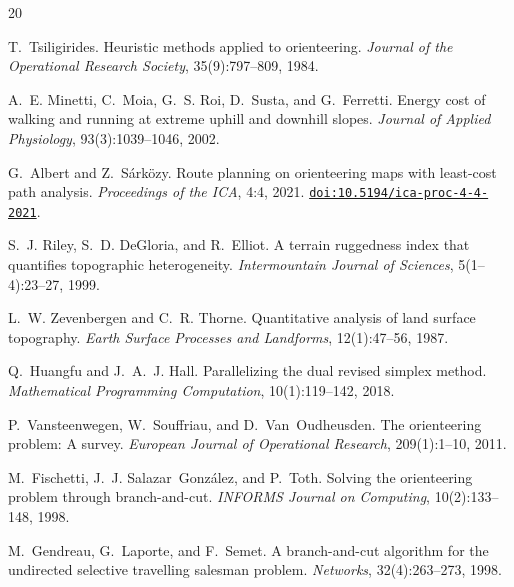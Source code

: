 \documentclass[preprint,11pt]{elsarticle}
\providecommand{\doi}[1]{\href{https://doi.org/#1}{\texttt{doi:#1}}}
\begin{document}
\begin{thebibliography}{20}

T.~Tsiligirides.
\newblock Heuristic methods applied to orienteering.
\newblock \emph{Journal of the Operational Research Society}, 35(9):797--809, 1984.

A.~E. Minetti, C.~Moia, G.~S. Roi, D.~Susta, and G.~Ferretti.
\newblock Energy cost of walking and running at extreme uphill and downhill slopes.
\newblock \emph{Journal of Applied Physiology}, 93(3):1039--1046, 2002.

G.~Albert and Z.~S\'{a}rk\"{o}zy.
\newblock Route planning on orienteering maps with least-cost path analysis.
\newblock \emph{Proceedings of the ICA}, 4:4, 2021.
\newblock \doi{10.5194/ica-proc-4-4-2021}.

S.~J. Riley, S.~D. DeGloria, and R.~Elliot.
\newblock A terrain ruggedness index that quantifies topographic heterogeneity.
\newblock \emph{Intermountain Journal of Sciences}, 5(1--4):23--27, 1999.

L.~W. Zevenbergen and C.~R. Thorne.
\newblock Quantitative analysis of land surface topography.
\newblock \emph{Earth Surface Processes and Landforms}, 12(1):47--56, 1987.

Q.~Huangfu and J.~A.~J. Hall.
\newblock Parallelizing the dual revised simplex method.
\newblock \emph{Mathematical Programming Computation}, 10(1):119--142, 2018.

P.~Vansteenwegen, W.~Souffriau, and D.~Van~Oudheusden.
\newblock The orienteering problem: A survey.
\newblock \emph{European Journal of Operational Research}, 209(1):1--10, 2011.

M.~Fischetti, J.~J. Salazar~Gonz\'{a}lez, and P.~Toth.
\newblock Solving the orienteering problem through branch-and-cut.
\newblock \emph{INFORMS Journal on Computing}, 10(2):133--148, 1998.

M.~Gendreau, G.~Laporte, and F.~Semet.
\newblock A branch-and-cut algorithm for the undirected selective travelling salesman problem.
\newblock \emph{Networks}, 32(4):263--273, 1998.


\end{thebibliography}
\end{document}

